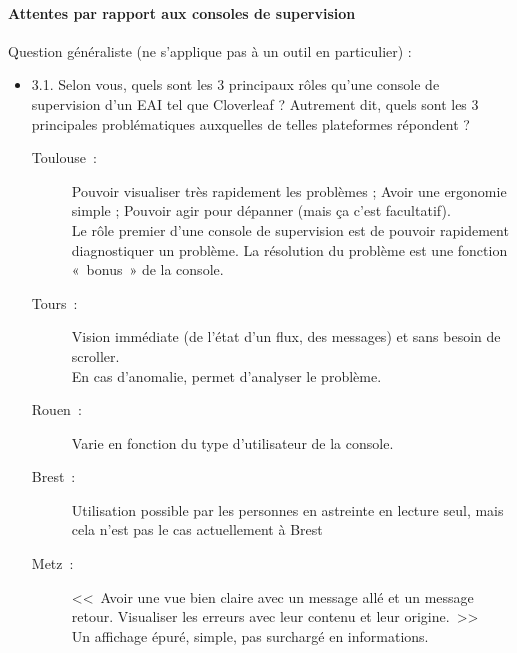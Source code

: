 	\paragraph{Attentes par rapport aux consoles de supervision}
	Question généraliste (ne s’applique pas à un outil en particulier) :
	\begin{itemize}
	  \item 3.1. Selon vous, quels sont les 3 principaux rôles qu’une console de
	  supervision d’un EAI tel que Cloverleaf ? Autrement dit, quels sont les 3
	  principales problématiques auxquelles de telles plateformes répondent ?
	  \begin{description}
	  	\item[Toulouse~:] Pouvoir visualiser très rapidement les problèmes ; Avoir
	  	une ergonomie simple ; Pouvoir agir pour dépanner (mais ça c’est
	  	facultatif).\\
	  	Le rôle premier d’une console de supervision est de pouvoir
	  	rapidement diagnostiquer un problème. La résolution du problème est une
	  	fonction «~bonus~» de la console.
	  	\item[Tours~:] Vision immédiate (de l’état d’un flux, des messages) et sans
	  	besoin de scroller.\\
		En cas d’anomalie, permet d’analyser le problème.
	  	\item[Rouen~:] Varie en fonction du type d’utilisateur de la console.
	  	\item[Brest~:] Utilisation possible par les personnes en astreinte en
	  	lecture seul, mais cela n’est pas le cas actuellement à Brest
	  	\item[Metz~:] <<~Avoir une vue bien claire avec un message allé et un
	  	message retour. Visualiser les erreurs avec leur contenu et leur
	  	origine.~>>\\
	  	Un affichage épuré, simple, pas surchargé en informations.
	  \end{description}
	\end{itemize}
	

